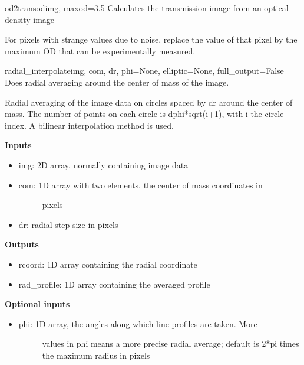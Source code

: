 \documentclass[letterpaper,10pt,english]{manual}
\begin{document}
\hypertarget{odysseus.imageprocess.od2trans}{}\begin{funcdesc}{od2trans}{odimg, maxod=3.5}
Calculates the transmission image from an optical density image

For pixels with strange values due to noise, replace the value of that pixel
by the maximum OD that can be experimentally measured.
\end{funcdesc}

\hypertarget{odysseus.imageprocess.radial_interpolate}{}\begin{funcdesc}{radial\_interpolate}{img, com, dr, phi=None, elliptic=None, full\_output=False}
Does radial averaging around the center of mass of the image.

Radial averaging of the image data on circles spaced by dr around the
center of mass. The number of points on each circle is dphi*sqrt(i+1),
with i the circle index. A bilinear interpolation method is used.

\textbf{Inputs}
\begin{itemize}
\item {} 
img: 2D array, normally containing image data

\item {} \begin{description}
\item[com: 1D array with two elements, the center of mass coordinates in] \leavevmode
pixels

\end{description}

\item {} 
dr: radial step size in pixels

\end{itemize}

\textbf{Outputs}
\begin{itemize}
\item {} 
rcoord: 1D array containing the radial coordinate

\item {} 
rad\_profile: 1D array containing the averaged profile

\end{itemize}

\textbf{Optional inputs}
\begin{itemize}
\item {} \begin{description}
\item[phi: 1D array, the angles along which line profiles are taken. More] \leavevmode
values in phi means a more precise radial average; default is
2*pi times the maximum radius in pixels


\end{description}
\end{itemize}
\end{funcdesc}
\end{document}
